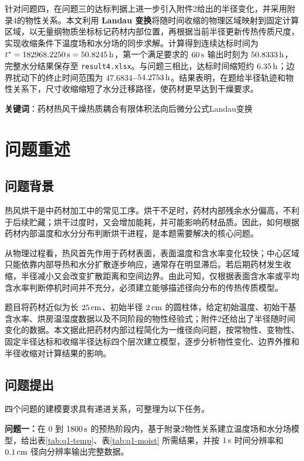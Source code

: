 \documentclass[UTF8,a4paper,12pt]{ctexart}
\begin{document}
针对问题四，在问题三的达标判据上进一步引入附件2给出的半径变化，并采用附录4的物性关系。本文利用\textbf{ Landau 变换}将随时间收缩的物理区域映射到固定计算区域，以无量纲物质坐标标记药材内部位置，再根据当前半径更新传热传质尺度，实现收缩条件下温度场和水分场的同步求解。计算得到连续达标时间为 \textbf{\boldmath$t^*=182968.2250\rm\,s=50.8245\rm\,h$}，第一个满足要求的 $60\rm\,s$ 输出时刻为 \textbf{\boldmath$50.8333\rm\,h$}，完整水分结果保存至 \texttt{result4.xlsx}。与问题三相比，达标时间缩短约 \textbf{\boldmath$6.35\rm\,h$}；边界扰动下的终止时间范围为 \textbf{\boldmath$47.6834$--$54.2753\rm\,h$}。结果表明，在题给半径轨迹和物性关系下，尺寸收缩缩短了水分迁移路径，使药材更早达到干燥要求。

\noindent \textbf{关键词}：药材热风干燥\quad 热质耦合\quad 有限体积法\quad 向后微分公式\quad Landau变换

\newpage
\section{问题重述}
\subsection{问题背景}
热风烘干是中药材加工中的常见工序。烘干不足时，药材内部残余水分偏高，不利于后续贮藏；烘干过度时，又会增加能耗，并可能影响药材品质。因此，如何根据药材内部温度和水分分布判断烘干进程，是本题需要解决的核心问题。

从物理过程看，热风首先作用于药材表面，表面温度和含水率变化较快；中心区域只能依靠内部导热和水分扩散逐步响应，通常存在明显滞后。若后期药材发生收缩，半径减小又会改变扩散距离和空间边界。由此可知，仅根据表面含水率或平均含水率判断停机时间并不充分，必须建立能够描述径向分布的传热传质模型。

题目将药材近似为长 $25\rm\,cm$、初始半径 $2\rm\,cm$ 的圆柱体，给定初始温度、初始干基含水率、烘房温湿度数据以及不同阶段的物性经验式；附件2还给出了半径随时间变化的数据。本文据此把药材内部过程简化为一维径向问题，按常物性、变物性、固定半径达标和收缩半径达标四个层次建立模型，逐步分析物性变化、边界外推和半径收缩对计算结果的影响。

\subsection{问题提出}
四个问题的建模要求具有递进关系，可整理为以下任务。

\textbf{问题一：}在 $0$ 到 $1800\rm\,s$ 的预热阶段内，基于附录2物性关系建立温度场和水分场模型，给出表\ref{tab:q1-temp}、表\ref{tab:q1-moist} 所需结果，并按 $1\rm\,s$ 时间分辨率和 $0.1\rm\,cm$ 径向分辨率输出完整数据。
\end{document}
